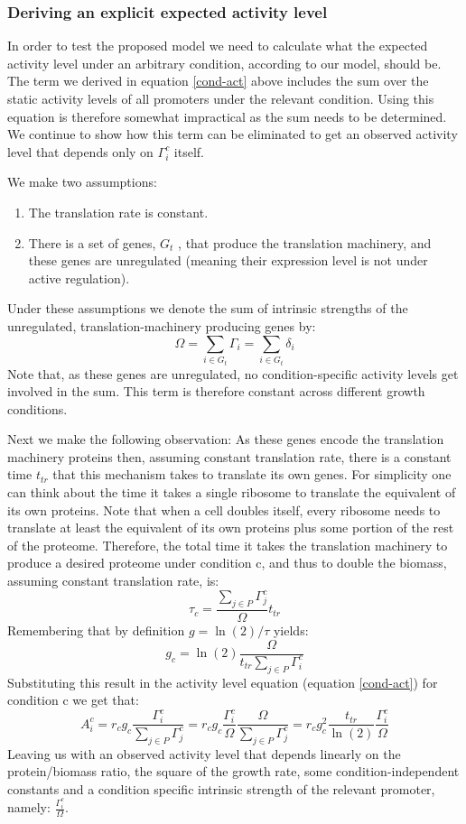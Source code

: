 \documentclass[a4page,notitlepage]{article}
\begin{document}
\subsubsection{Deriving an explicit expected activity level}
In order to test the proposed model we need to calculate what the expected activity level under an arbitrary condition, according to our model, should be.
The term we derived in equation \ref{cond-act} above includes the sum over the static activity levels of all promoters under the relevant condition.
Using this equation is therefore somewhat impractical as the sum needs to be determined.
We continue to show how this term can be eliminated to get an observed activity level that depends only on $\Gamma^c_i$ itself.

We make two assumptions:
\begin{enumerate}
\item The translation rate is constant.
\item There is a set of genes, $G_t$ , that produce the translation machinery, and these genes are unregulated (meaning their expression level is not under active regulation).
\end{enumerate}
Under these assumptions we denote the sum of intrinsic strengths of the unregulated, translation-machinery producing genes by:
\[\Omega=\sum_{i \in G_t}\Gamma_i=\sum_{i \in G_t}\delta_i\]
Note that, as these genes are unregulated, no condition-specific activity levels get involved in the sum.
This term is therefore constant across different growth conditions.

Next we make the following observation:
As these genes encode the translation machinery proteins then, assuming constant translation rate, there is a constant time $t_{tr}$ that this mechanism takes to translate its own genes.
For simplicity one can think about the time it takes a single ribosome to translate the equivalent of its own proteins.
Note that when a cell doubles itself, every ribosome needs to translate at least the equivalent of its own proteins plus some portion of the rest of the proteome.
Therefore, the total time it takes the translation machinery to produce a desired proteome under condition c, and thus to double the biomass, assuming constant translation rate, is:
\[\tau_c=\frac{\sum_{j\in P}\Gamma^c_j}{\Omega}t_{tr}\]
Remembering that by  definition $g=\ln(2)/\tau$ yields:
\[g_c=\ln(2)\frac{\Omega}{t_{tr}\sum_{j\in P}\Gamma^c_i}\]
Substituting this result in the activity level equation (equation \ref{cond-act}) for condition c we get that:
\begin{equation}
\label{ind-act}
A^c_i=r_c g_c \frac{\Gamma^c_i}{\sum_{j\in P}\Gamma^c_j}=r_c g_c \frac{\Gamma^c_i}{\Omega}\frac{\Omega}{\sum_{j\in P}\Gamma^c_j}=r_c g_c^2\frac{t_{tr}}{\ln(2)}\frac{\Gamma^c_i}{\Omega}
\end{equation}
Leaving us with an observed activity level that depends linearly on the protein/biomass ratio, the square of the growth rate, some condition-independent constants and a condition specific intrinsic strength of the relevant promoter, namely: $\frac{\Gamma^c_i}{\Omega}$.
\end{document}

